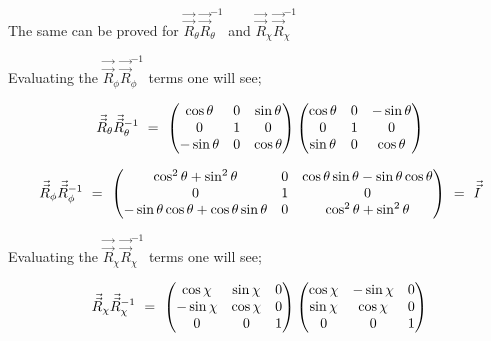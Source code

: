 \documentclass{ece}
\begin{document}
The same can be proved for \begin{math} \vec{\vec{R}}_{\theta} \vec{\vec{R}}_{\theta}^{-1} \end{math} and \begin{math} \vec{\vec{R}}_{\chi} \vec{\vec{R}}_{\chi}^{-1} \end{math} 

Evaluating the \begin{math} \vec{\vec{R}}_{\phi} \vec{\vec{R}}_{\phi}^{-1} \end{math} terms one will see;

\begin{equation}
\vec{\vec{R}}_{\theta} \vec{\vec{R}}_{\theta}^{-1}  \hspace{0.125cm} = \hspace{0.125cm} 
\begin{pmatrix}
\cos{\theta} & 0 & \sin{\theta} \\
0 & 1 & 0 \\
-\sin{\theta} & 0 & \cos{\theta} 
\end{pmatrix}
\begin{pmatrix}
\cos{\theta} & 0 & -\sin{\theta} \\
0 & 1 & 0 \\
\sin{\theta} & 0 & \cos{\theta} 
\end{pmatrix}
\end{equation}

\begin{equation}
\vec{\vec{R}}_{\phi} \vec{\vec{R}}_{\phi}^{-1} 
\hspace{0.125cm} = \hspace{0.125cm} 
\begin{pmatrix}
\cos^{2}{\theta} + \sin^{2}{\theta} & 0 & \cos{\theta} \sin{\theta} - \sin{\theta} \cos{\theta}  \\
0 & 1 & 0 \\
- \sin{\theta} \cos{\theta} + \cos{\theta} \sin{\theta}  & 0 & \cos^{2}{\theta} + \sin^{2}{\theta} 
\end{pmatrix}
\hspace{0.125cm} = \hspace{0.125cm} \vec{\vec{I}}
\end{equation}

Evaluating the \begin{math} \vec{\vec{R}}_{\chi} \vec{\vec{R}}_{\chi}^{-1} \end{math} terms one will see;

\begin{equation}
\vec{\vec{R}}_{\chi} \vec{\vec{R}}_{\chi}^{-1} \hspace{0.125cm} = \hspace{0.125cm} 
\begin{pmatrix}
\cos{\chi} & \sin{\chi} & 0 \\
-\sin{\chi} & \cos{\chi} & 0 \\
0 & 0 & 1 
\end{pmatrix}
\begin{pmatrix}
\cos{\chi} & -\sin{\chi} & 0 \\
\sin{\chi} & \cos{\chi} & 0 \\
0 & 0 & 1 
\end{pmatrix}
\end{equation}
\end{document}
